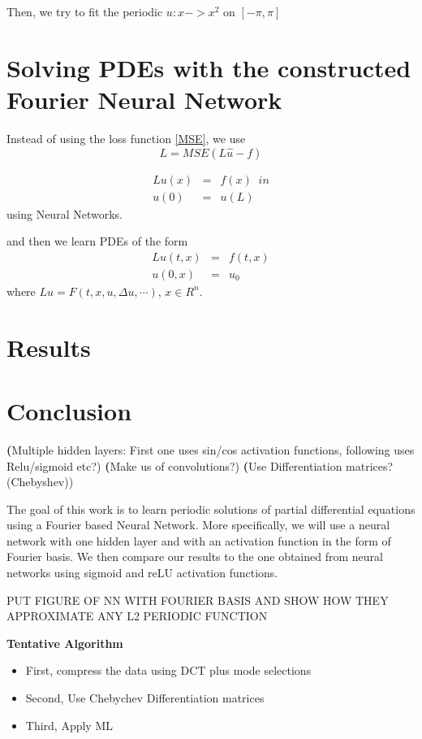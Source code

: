 \documentclass[11pt]{article}
\begin{document}
Then, we try to fit the periodic $u: x -> x^2$ on $[-\pi, \pi]$


\section{Solving PDEs with the constructed Fourier Neural Network}
Instead of using the loss function \ref{MSE}, we use 
 \begin{equation}\label{MSE_pde}
     L = MSE (L\hat{u} - f)
 \end{equation}

\begin{eqnarray*}
    Lu(x) &=& f(x) \;\; in\\
    u(0) &=& u(L)
\end{eqnarray*}
using Neural Networks. 

and then we learn PDEs of the form 
\begin{eqnarray*}
    Lu(t,x) &=& f(t,x)\\
    u(0,x) &=& u_0
\end{eqnarray*}
where $Lu = F(t,x,u,\Delta u, \cdots)$, $x \in R^n$.


\section{Results}



\section{Conclusion}




















\textbf(Multiple hidden layers: First one uses sin/cos activation functions, following uses Relu/sigmoid etc?)
\textbf(Make us of convolutions?)
\textbf(Use Differentiation matrices?(Chebyshev))


The goal of this work is to learn periodic solutions of partial differential equations using a Fourier based Neural Network. More specifically, we will use a neural network with one hidden layer and with an activation function in the form of Fourier basis. We then compare our results to the one obtained from neural networks using sigmoid and reLU activation functions.

PUT FIGURE OF NN WITH FOURIER BASIS AND SHOW HOW THEY APPROXIMATE ANY L2 PERIODIC  FUNCTION

\textbf{Tentative Algorithm}
\begin{itemize}
\item First, compress the data using DCT plus mode selections
\item Second, Use Chebychev Differentiation matrices
\item Third, Apply ML

\end{itemize}






\end{document}
